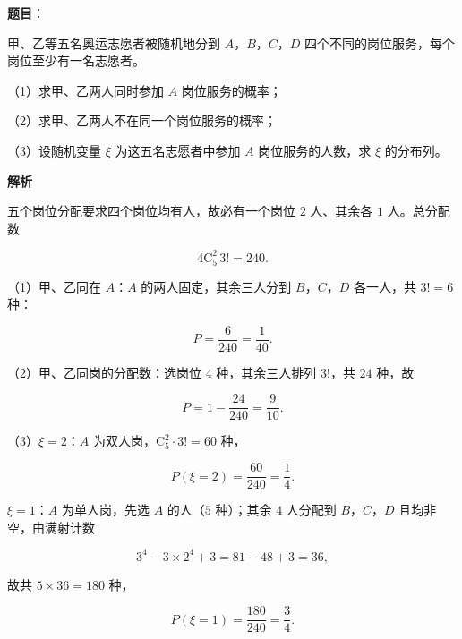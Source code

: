 \begin{answer}

\textbf{题目}：

甲、乙等五名奥运志愿者被随机地分到 $A$，$B$，$C$，$D$ 四个不同的岗位服务，每个岗位至少有一名志愿者。

（1）求甲、乙两人同时参加 $A$ 岗位服务的概率；

（2）求甲、乙两人不在同一个岗位服务的概率；

（3）设随机变量 $\xi$ 为这五名志愿者中参加 $A$ 岗位服务的人数，求 $\xi$ 的分布列。

\textbf{解析}

五个岗位分配要求四个岗位均有人，故必有一个岗位 $2$ 人、其余各 $1$ 人。总分配数

\nopagebreak[4]
\[4\mathrm C_5^2\,3!=240.\]

（1）甲、乙同在 $A$：$A$ 的两人固定，其余三人分到 $B$，$C$，$D$ 各一人，共 $3!=6$ 种：

\nopagebreak[4]
\[P=\frac6{240}=\frac1{40}.\]

（2）甲、乙同岗的分配数：选岗位 $4$ 种，其余三人排列 $3!$，共 $24$ 种，故

\nopagebreak[4]
\[P=1-\frac{24}{240}=\frac9{10}.\]

（3）$\xi=2$：$A$ 为双人岗，$\mathrm C_5^2\cdot3!=60$ 种，

\nopagebreak[4]
\[P(\xi=2)=\frac{60}{240}=\frac14.\]

$\xi=1$：$A$ 为单人岗，先选 $A$ 的人（$5$ 种）；其余 $4$ 人分配到 $B$，$C$，$D$ 且均非空，由满射计数

\nopagebreak[4]
\[3^4-3\times2^4+3=81-48+3=36,\]

故共 $5\times36=180$ 种，

\nopagebreak[4]
\[P(\xi=1)=\frac{180}{240}=\frac34.\]


\end{answer}
